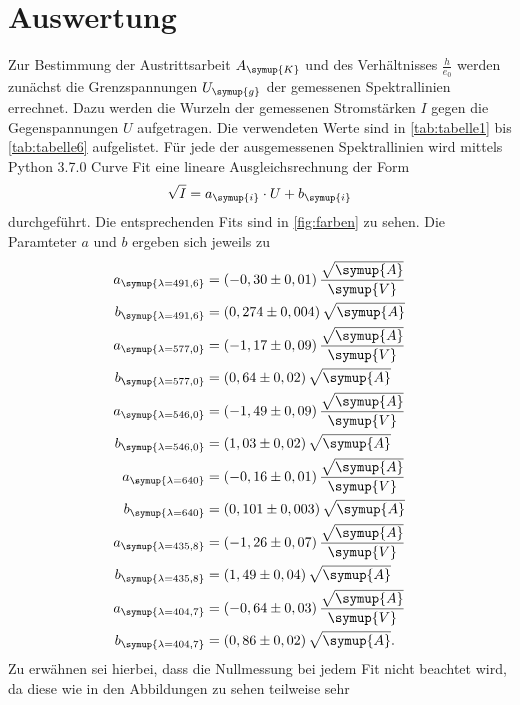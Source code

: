 \section{Auswertung}
\label{sec:Auswertung}
Zur Bestimmung der Austrittsarbeit $A_{\symup{K}}$ und des Verhältnisses $\frac{h}{e_0}$ werden zunächst die Grenzspannungen $U_{\symup{g}}$
der gemessenen Spektrallinien errechnet. Dazu werden die Wurzeln der gemessenen Stromstärken $I$ gegen die Gegenspannungen $U$ aufgetragen.
Die verwendeten Werte sind in \autoref{tab:tabelle1} bis \autoref{tab:tabelle6} aufgelistet. Für jede der ausgemessenen Spektrallinien wird mittels Python 3.7.0 Curve Fit
eine lineare Ausgleichsrechnung der Form 
\begin{equation}
\label{eqn:ausgleich1}
  \sqrt{I} = a_{\symup{i}} \cdot U + b_{\symup{i}} 
\end{equation}
durchgeführt. Die entsprechenden Fits sind in \autoref{fig:farben} zu sehen. Die Paramteter $a$ und $b$ ergeben sich jeweils zu 
\begin{align*}
  a_{\symup{\lambda = 491,6 }} &= (-0,30 \pm 0,01) \, \frac{\sqrt{\symup{A}}}{\symup{V}} \\
  b_{\symup{\lambda = 491,6 }} &= (0,274 \pm 0,004) \, \sqrt{\symup{A}} \\
  a_{\symup{\lambda = 577,0 }} &= (-1,17 \pm 0,09) \, \frac{\sqrt{\symup{A}}}{\symup{V}} \\
  b_{\symup{\lambda = 577,0 }} &= (0,64 \pm 0,02) \,  \sqrt{\symup{A}} \\
  a_{\symup{\lambda = 546,0 }} &= (-1,49 \pm 0,09) \, \frac{\sqrt{\symup{A}}}{\symup{V}} \\
  b_{\symup{\lambda = 546,0 }} &= (1,03 \pm 0,02) \,  \sqrt{\symup{A}} \\
  a_{\symup{\lambda = 640}} &= (-0,16 \pm 0,01) \, \frac{\sqrt{\symup{A}}}{\symup{V}} \\
  b_{\symup{\lambda = 640}} &= (0,101 \pm 0,003) \,\sqrt{\symup{A}} \\
  a_{\symup{\lambda = 435,8 }} &= (-1,26 \pm 0,07) \, \frac{\sqrt{\symup{A}}}{\symup{V}} \\
  b_{\symup{\lambda = 435,8 }} &= (1,49 \pm 0,04) \,  \sqrt{\symup{A}} \\
  a_{\symup{\lambda = 404,7 }} &= (-0,64 \pm 0,03) \, \frac{\sqrt{\symup{A}}}{\symup{V}} \\
  b_{\symup{\lambda = 404,7 }} &= (0,86 \pm 0,02) \,  \sqrt{\symup{A}}. \\
\end{align*} 
Zu erwähnen sei hierbei, dass die Nullmessung bei jedem Fit nicht beachtet wird, da diese wie in den Abbildungen zu sehen teilweise sehr 
